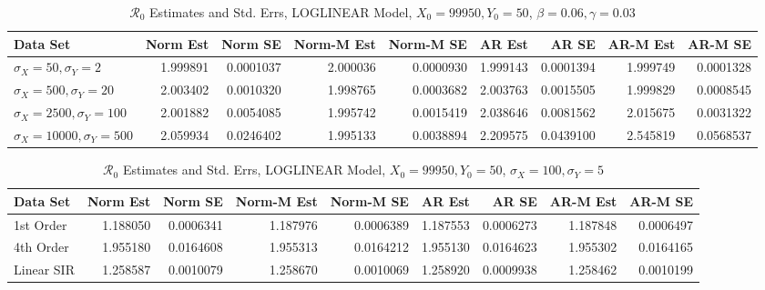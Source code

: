 \documentclass[12pt]{article}
\newcommand{\rr}{\ensuremath{\mathcal{R}_0}}
\begin{document}
\begin{table}[H]
	
	\caption{\label{tab:}$\rr$ Estimates and Std. Errs, LOGLINEAR Model,
		$X_0 = 99950, Y_0 = 50$, $\beta = 0.06, \gamma = 0.03$}
	\centering
	\begin{footnotesize}
		\begin{tabular}[t]{l|r|r|r|r|r|r|r|r}
			\hline
			Data Set & Norm Est & Norm SE & Norm-M Est & Norm-M SE & AR Est & AR SE & AR-M Est & AR-M SE\\
			\hline
			$\sigma_X = 50, \sigma_Y = 2$ & 1.999891 & 0.0001037 & 2.000036 & 0.0000930 & 1.999143 & 0.0001394 & 1.999749 & 0.0001328\\
			\hline
			$\sigma_X = 500, \sigma_Y = 20$ & 2.003402 & 0.0010320 & 1.998765 & 0.0003682 & 2.003763 & 0.0015505 & 1.999829 & 0.0008545\\
			\hline
			$\sigma_X = 2500, \sigma_Y = 100$ & 2.001882 & 0.0054085 & 1.995742 & 0.0015419 & 2.038646 & 0.0081562 & 2.015675 & 0.0031322\\
			\hline
			$\sigma_X = 10000, \sigma_Y = 500$ & 2.059934 & 0.0246402 & 1.995133 & 0.0038894 & 2.209575 & 0.0439100 & 2.545819 & 0.0568537\\
			\hline
		\end{tabular}
	\end{footnotesize}
\end{table}

\begin{table}[H]
	
	\caption{\label{tab:}$\rr$ Estimates and Std. Errs, LOGLINEAR Model,
		$X_0 = 99950, Y_0 = 50$, $\sigma_X = 100, \sigma_Y = 5$}
	\centering
	\begin{footnotesize}
		\begin{tabular}[t]{l|r|r|r|r|r|r|r|r}
			\hline
			Data Set & Norm Est & Norm SE & Norm-M Est & Norm-M SE & AR Est & AR SE & AR-M Est & AR-M SE\\
			\hline
			1st Order & 1.188050 & 0.0006341 & 1.187976 & 0.0006389 & 1.187553 & 0.0006273 & 1.187848 & 0.0006497\\
			\hline
			4th Order & 1.955180 & 0.0164608 & 1.955313 & 0.0164212 & 1.955130 & 0.0164623 & 1.955302 & 0.0164165\\
			\hline
			Linear SIR & 1.258587 & 0.0010079 & 1.258670 & 0.0010069 & 1.258920 & 0.0009938 & 1.258462 & 0.0010199\\
			\hline
		\end{tabular}
	\end{footnotesize}
\end{table}
\end{document}

